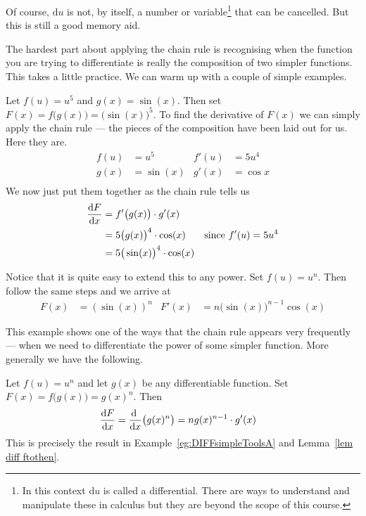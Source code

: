 Of course,  $\mathrm{d}u$ is not, by itself, a number or variable\footnote{In
this context $\mathrm{d}u$ is called a differential. There are ways to
understand and manipulate these in calculus but they are beyond the scope of
this course.} that can be cancelled. But this is still a good memory aid.

The hardest part about applying the chain rule is recognising
when the function you are trying to differentiate is really
the composition of two simpler functions. This takes a little practice.
We can warm up with a couple of simple examples.

\begin{eg}\label{eg:DIFFchainruleA}
 Let $f(u) = u^5$ and $g(x) = \sin(x)$. Then set
$F(x) = f\big(g(x)\big) = \big(\sin(x)\big)^5$. To find the
derivative of $F(x)$ we can simply apply the chain rule  ---
the pieces of the composition have been laid out for us. Here
they are.
\begin{align*}
  f(u) &= u^5 & f'(u) &= 5u^4 \\
  g(x) &= \sin(x) & g'(x) &= \cos x \\
\end{align*}
We now just put them together as the chain rule tells us
\begin{align*}
  \diff{F}{x} &= f'\big(g(x)\big) \cdot g'(x) \\
  &= 5\big(g(x)\big)^4 \cdot \cos(x) & \text{since $f'(u) = 5u^4$} \\
  &= 5 \big(\sin(x)\big)^4 \cdot \cos(x)
\end{align*}

Notice that it is quite easy to extend this to any power.
Set $f(u) = u^n$. Then follow the same steps and we arrive at
\begin{align*}
  F(x) &= (\sin(x))^n & F'(x) &= n \big(\sin(x) \big)^{n-1} \cos(x)
\end{align*}
\end{eg}



This example shows one of the ways that the chain rule appears
very frequently --- when we need to differentiate the power of
some simpler function. More generally we have the following.
\begin{eg}
 Let $f(u) = u^n$ and let $g(x)$ be any differentiable function.
Set $F(x) = f\big(g(x)\big) = g(x)^n$. Then
\begin{align*}
  \diff{F}{x} = \diff{}{x} \big( g(x)^n \big) &= n g(x)^{n-1} \cdot g'(x)
\end{align*}
This is precisely the result in Example~\ref{eg:DIFFsimpleToolsA}  and
Lemma~\ref{lem diff ftothen}.
\end{eg}

